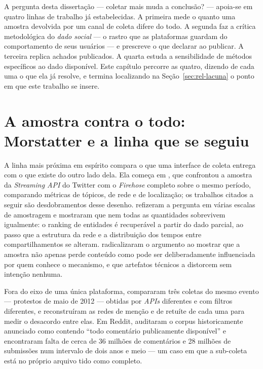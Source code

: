 A pergunta desta dissertação --- coletar mais muda a conclusão? --- apoia-se em
quatro linhas de trabalho já estabelecidas. A primeira mede o quanto uma amostra
devolvida por um canal de coleta difere do todo. A segunda faz a crítica metodológica
do \emph{dado social} --- o rastro que as plataformas guardam do comportamento de seus
usuários --- e prescreve o que declarar ao publicar. A terceira replica achados
publicados. A quarta estuda a sensibilidade de métodos específicos ao dado disponível.
Este capítulo percorre as quatro, dizendo de cada uma o que ela já resolve, e termina
localizando na Seção~\ref{sec:rel-lacuna} o ponto em que este trabalho se insere.

\section[A amostra contra o todo: Morstatter e a linha que se seguiu]{A amostra
contra o todo: Morstatter e a linha que se seguiu}
\label{sec:rel-amostra}

A linha mais próxima em espírito compara o que uma interface de coleta entrega com o
que existe do outro lado dela. Ela começa em , que
confrontou a amostra da \emph{Streaming API} do Twitter com o \emph{Firehose} completo
sobre o mesmo período, comparando métricas de tópicos, de rede e de localização; os
trabalhos citados a seguir são desdobramentos desse desenho.  refizeram a pergunta em
várias escalas de amostragem e mostraram que nem todas as quantidades sobrevivem
igualmente: o ranking de entidades é recuperável a partir do dado parcial, ao passo que
a estrutura da rede e a distribuição dos tempos entre compartilhamentos se alteram.
 radicalizaram o argumento ao mostrar que a amostra não
apenas perde conteúdo como pode ser deliberadamente influenciada por quem conhece o
mecanismo, e que artefatos técnicos a distorcem sem intenção nenhuma.

Fora do eixo de uma única plataforma,  compararam
três coletas do mesmo evento --- protestos de maio de 2012 --- obtidas por
\emph{APIs} diferentes e com filtros diferentes, e reconstruíram as redes de menção e
de retuíte de cada uma para medir o desacordo entre elas. Em Reddit,
 auditaram o corpus historicamente anunciado como
contendo ``todo comentário publicamente disponível'' e encontraram falta de cerca de 36
milhões de comentários e 28 milhões de submissões num intervalo de dois anos e meio ---
um caso em que a sub-coleta está no próprio arquivo tido como completo.

